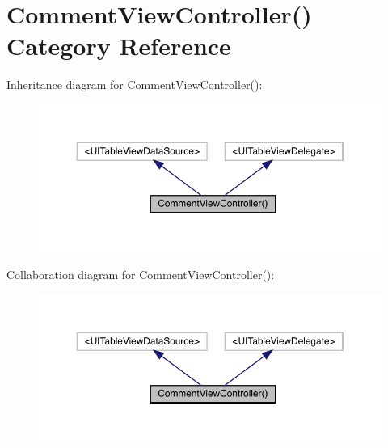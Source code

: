 \hypertarget{category_comment_view_controller_07_08}{}\section{Comment\+View\+Controller() Category Reference}
\label{category_comment_view_controller_07_08}


Inheritance diagram for Comment\+View\+Controller()\+:\nopagebreak
\begin{figure}[H]
\begin{center}
\leavevmode
\includegraphics[width=350pt]{category_comment_view_controller_07_08__inherit__graph}
\end{center}
\end{figure}


Collaboration diagram for Comment\+View\+Controller()\+:\nopagebreak
\begin{figure}[H]
\begin{center}
\leavevmode
\includegraphics[width=350pt]{category_comment_view_controller_07_08__coll__graph}
\end{center}
\end{figure}

